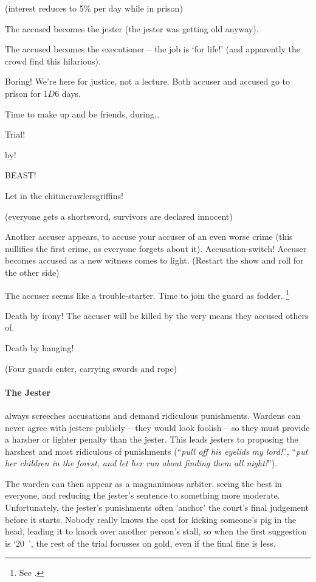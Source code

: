 \begin{multicols}{2}
\begin{dlist}
  (interest reduces to 5\% per day while in prison)
  \item
  The accused becomes the jester (the jester was getting old anyway).
  \item
  The accused becomes the executioner -- the job is `for life!' (and apparently the crowd find this hilarious).
  \item
  Boring!
  We're here for justice, not a lecture.
  Both accuser and accused go to prison for $1D6$ days.
  \item
  Time to make up and be friends, during\ldots

  Trial!

  by!

  BEAST!

  Let in the \ifodd\value{r4} chitincrawlers\else griffins\fi!

  (everyone gets a shortsword, survivors are declared innocent)
  \item
  \ifodd\value{r3}
    Another accuser appears, to accuse your accuser of an even worse crime (this nullifies the first crime, as everyone forgets about it).
  \else
    Accusation-switch!
    Accuser becomes accused as a new witness comes to light.
    (Restart the show and roll for the other side)
  \fi
  \item
  The accuser seems like a trouble-starter.
  Time to join the \gls{guard} as fodder.%
  \footnote{See .}
  \item
  Death by irony!
  The accuser will be killed by the very means they accused others of.
  \item
  Death by hanging!

  (Four guards enter, carrying swords and rope)
\end{dlist}

\paragraph{The Jester}
always screeches accusations and demand ridiculous punishments.
Wardens can never agree with jesters publicly -- they would look foolish -- so they must provide a harsher or lighter penalty than the jester.
This leads jesters to proposing the harshest and most ridiculous of punishments (``\emph{pull off his eyelids my lord!}'', ``\emph{put her children in the forest, and let her run about finding them all night!}'').

The warden can then appear as a magnanimous arbiter, seeing the best in everyone, and reducing the jester's sentence to something more moderate.
Unfortunately, the jester's punishments often 'anchor' the court's final judgement before it starts.
Nobody really knows the cost for kicking someone's pig in the head, leading it to knock over another person's stall, so when the first suggestion is `20~', the rest of the trial focusses on gold, even if the final fine is less.



\end{multicols}
